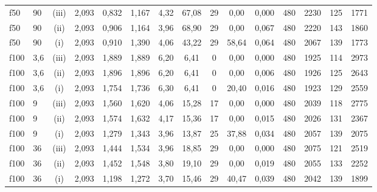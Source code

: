 \begin{tabular}{llc ccc c cc c c cc cc}
\midrule
f50 & 90 & (iii) & 2{,}093 & 0{,}832 & 1{,}167 & 4{,}32 & 67{,}08 & 29 & 0{,}00 & 0{,}000 & 480 & 2230 & 125 & 1771\\
f50 & 90 & (ii) & 2{,}093 & 0{,}906 & 1{,}164 & 3{,}96 & 68{,}90 & 29 & 0{,}00 & 0{,}067 & 480 & 2220 & 143 & 1860\\
f50 & 90 & (i) & 2{,}093 & 0{,}910 & 1{,}390 & 4{,}06 & 43{,}22 & 29 & 58{,}64 & 0{,}064 & 480 & 2067 & 139 & 1773\\
\midrule
f100 & 3{,}6 & (iii) & 2{,}093 & 1{,}889 & 1{,}889 & 6{,}20 & 6{,}41 & 0 & 0{,}00 & 0{,}000 & 480 & 1925 & 114 & 2973\\
f100 & 3{,}6 & (ii) & 2{,}093 & 1{,}896 & 1{,}896 & 6{,}20 & 6{,}41 & 0 & 0{,}00 & 0{,}006 & 480 & 1926 & 125 & 2643\\
f100 & 3{,}6 & (i) & 2{,}093 & 1{,}754 & 1{,}736 & 6{,}30 & 6{,}41 & 0 & 20{,}40 & 0{,}016 & 480 & 1923 & 129 & 2559\\
\midrule
f100 & 9 & (iii) & 2{,}093 & 1{,}560 & 1{,}620 & 4{,}06 & 15{,}28 & 17 & 0{,}00 & 0{,}000 & 480 & 2039 & 118 & 2775\\
f100 & 9 & (ii) & 2{,}093 & 1{,}574 & 1{,}632 & 4{,}17 & 15{,}36 & 17 & 0{,}00 & 0{,}015 & 480 & 2026 & 131 & 2367\\
f100 & 9 & (i) & 2{,}093 & 1{,}279 & 1{,}343 & 3{,}96 & 13{,}87 & 25 & 37{,}88 & 0{,}034 & 480 & 2057 & 139 & 2075\\
\midrule
f100 & 36 & (iii) & 2{,}093 & 1{,}444 & 1{,}534 & 3{,}96 & 18{,}85 & 29 & 0{,}00 & 0{,}000 & 480 & 2075 & 121 & 2519\\
f100 & 36 & (ii) & 2{,}093 & 1{,}452 & 1{,}548 & 3{,}80 & 19{,}10 & 29 & 0{,}00 & 0{,}019 & 480 & 2055 & 133 & 2252\\
f100 & 36 & (i) & 2{,}093 & 1{,}198 & 1{,}272 & 3{,}70 & 15{,}46 & 29 & 40{,}47 & 0{,}039 & 480 & 2042 & 139 & 1899\\
\bottomrule
\end{tabular}
